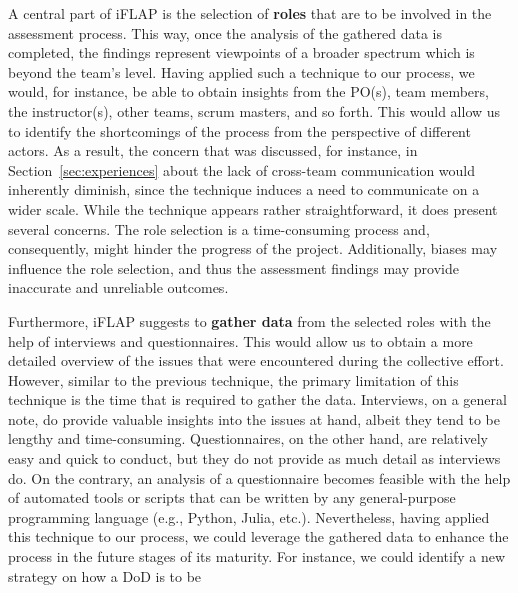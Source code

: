 \documentclass[conference]{IEEEtran}
\begin{document}
A central part of iFLAP is the selection of \textbf{roles} that are to be
involved in the assessment process. This way, once the analysis of the gathered
data is completed, the findings represent viewpoints of a broader spectrum
which is beyond the team's level. Having applied such a technique to our
process, we would, for instance, be able to obtain insights from the PO(s),
team members, the instructor(s), other teams, scrum masters, and so forth. This
would allow us to identify the shortcomings of the process from the perspective
of different actors. As a result, the concern that was discussed, for instance,
in Section~\ref{sec:experiences} about the lack of cross-team communication
would inherently diminish, since the technique induces a need to communicate on
a wider scale. While the technique appears rather straightforward, it does
present several concerns. The role selection is a time-consuming process and,
consequently, might hinder the progress of the project. Additionally, biases
may influence the role selection, and thus the assessment findings may provide
inaccurate and unreliable outcomes.

Furthermore, iFLAP suggests to \textbf{gather data} from the selected roles
with the help of interviews and questionnaires. This would allow us to obtain
a more detailed overview of the issues that were encountered during the collective
effort. However, similar to the previous technique, the primary limitation of
this technique is the time that is required to gather the data. Interviews, on
a general note, do provide valuable insights into the issues at hand, albeit
they tend to be lengthy and time-consuming. Questionnaires, on the other hand,
are relatively easy and quick to conduct, but they do not provide as much
detail as interviews do. On the contrary, an analysis of a questionnaire
becomes feasible with the help of automated tools or scripts that can be
written by any general-purpose programming language (e.g., Python, Julia,
etc.). Nevertheless, having applied this technique to our process, we could
leverage the gathered data to enhance the process in the future stages of its
maturity. For instance, we could identify a new strategy on how a DoD is to be
\end{document}

